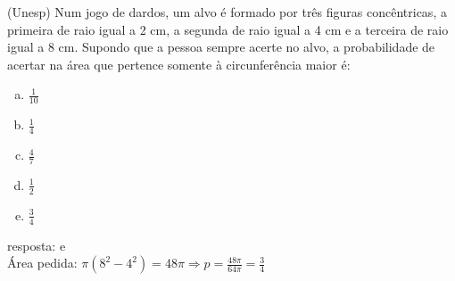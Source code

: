 \begin{ex}
  (Unesp) Num jogo de dardos, um alvo é formado por três figuras concêntricas, a primeira de raio igual a 2 cm, a segunda de raio igual a 4 cm e a terceira de raio igual a 8 cm. Supondo que a pessoa sempre acerte no alvo, a probabilidade de acertar na área que pertence somente à circunferência maior é:
  \begin{center}
  \end{center}
    \begin{enumerate}[(a)]    
    \item $\frac{1}{10}$
    \item $\frac{1}{4}$
    \item $\frac{4}{7}$
    \item $\frac{1}{2}$
    \item $\frac{3}{4}$
    \end{enumerate}
      \begin{sol}
        resposta: e \\
        Área pedida: $\pi(8^2-4^2)=48\pi\Longrightarrow p= \frac{48\pi}{64\pi}=\frac{3}{4}$
      \end{sol}
\end{ex}